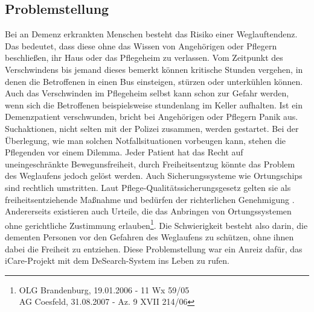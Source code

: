 \subsection{Problemstellung}
Bei an Demenz erkrankten Menschen besteht das Risiko einer Weglauftendenz. Das bedeutet, dass diese ohne das Wissen von Angehörigen oder Pflegern beschließen, ihr Haus oder das Pflegeheim zu verlassen. Vom Zeitpunkt des Verschwindens bis jemand dieses bemerkt können kritische Stunden vergehen, in denen die Betroffenen in einen Bus einsteigen, stürzen oder unterkühlen können. Auch das Verschwinden im Pflegeheim selbst kann schon zur Gefahr werden, wenn sich die Betroffenen beispielsweise stundenlang im Keller aufhalten. Ist ein Demenzpatient verschwunden, bricht bei Angehörigen oder Pflegern Panik aus. Suchaktionen, nicht selten mit der Polizei zusammen, werden gestartet. Bei der Überlegung, wie man solchen Notfallsituationen vorbeugen kann, stehen die Pflegenden vor einem Dilemma. Jeder Patient hat das Recht auf uneingeschränkte Bewegunsfreiheit, durch Freiheitsentzug könnte das Problem des Weglaufens jedoch gelöst werden. Auch Sicherungssysteme wie Ortungschips sind rechtlich umstritten. Laut Pflege-Qualitätssicherungsgesetz gelten sie als freiheitsentziehende Maßnahme und bedürfen der richterlichen Genehmigung \citep[Vgl.][]{pqsg}. Andererseits existieren auch Urteile, die das Anbringen von Ortungssystemen ohne gerichtliche Zustimmung erlauben\footnote{OLG Brandenburg, 19.01.2006 - 11 Wx 59/05\\AG Coesfeld, 31.08.2007 - Az. 9 XVII 214/06}. Die Schwierigkeit besteht also darin, die dementen Personen vor den Gefahren des Weglaufens zu schützen, ohne ihnen dabei die Freiheit zu entziehen. Diese Problemstellung war ein Anreiz dafür, das iCare-Projekt mit dem DeSearch-System ins Leben zu rufen.
